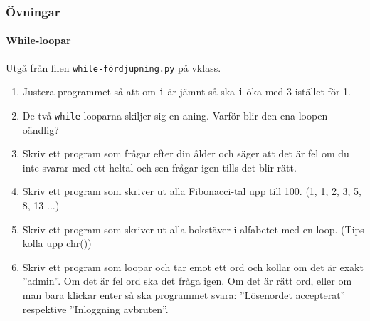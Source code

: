 \documentclass{beamer}
\begin{document}
\begin{frame}[fragile]
\frametitle{Övningar}
\framesubtitle{While-loopar}

Utgå från filen \texttt{while-fördjupning.py} på vklass.

\begin{enumerate}
\item Justera programmet så att om \texttt{i} är jämnt så ska \texttt{i} öka med 3 istället för 1.
\item De två \texttt{while}-looparna skiljer sig en aning. Varför blir den ena loopen oändlig?
\item Skriv ett program som frågar efter din ålder och säger att det är fel om du inte svarar med ett heltal och sen frågar igen tills det blir rätt.
\item Skriv ett program som skriver ut alla Fibonacci-tal upp till 100. (1, 1, 2, 3, 5, 8, 13 ...)
\item Skriv ett program som skriver ut alla bokstäver i alfabetet med en loop. (Tips kolla upp \href{https://docs.python.org/2/library/functions.html#chr}{chr()})
\item Skriv ett program som loopar och tar emot ett ord och kollar om det är exakt ''admin''. Om det är fel ord ska det fråga igen. Om det är rätt ord, eller om man bara klickar enter så ska programmet svara: ''Lösenordet accepterat'' respektive ''Inloggning avbruten''.
\end{enumerate}

\end{frame}
\end{document}
